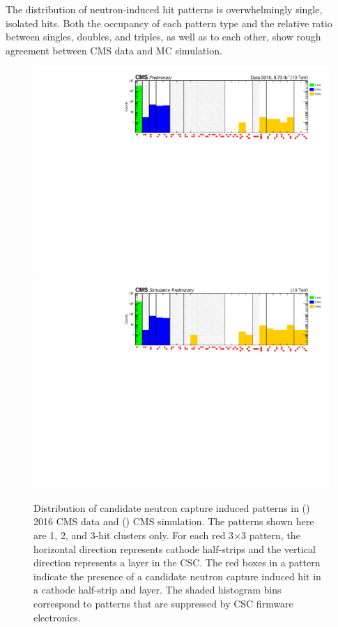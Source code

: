 The distribution of neutron-induced hit patterns is overwhelmingly single, isolated hits. Both the occupancy of each pattern type and the relative ratio between singles, doubles, and triples, as well as to each other, show rough agreement between CMS data and MC simulation.

\begin{figure}[!h]
	\centering
	\includegraphics[width=\fullFigWidth]{figures/neutron/BGPatterns_P5.pdf}
	\includegraphics[width=\fullFigWidth]{figures/neutron/BGPatterns_MC.pdf}
  \caption[Distribution of candidate neutron capture induced patterns in 2016 CMS data and CMS simulation.]{Distribution of candidate neutron capture induced patterns in () 2016 CMS data and () CMS simulation. The patterns shown here are 1, 2, and 3-hit clusters only. For each red 3$\times$3 pattern, the horizontal direction represents cathode half-strips and the vertical direction represents a layer in the CSC. The red boxes in a pattern indicate the presence of a candidate neutron capture induced hit in a cathode half-strip and layer. The shaded histogram bins correspond to patterns that are suppressed by CSC firmware electronics.}
	\label{fig:pattern}
\end{figure}

